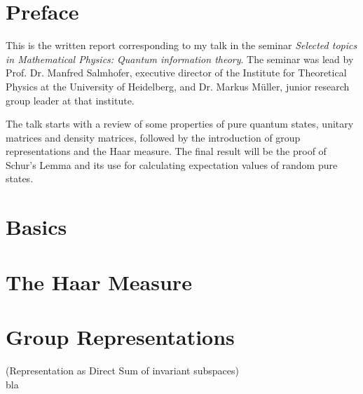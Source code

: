 \documentclass[a4paper,11pt, BCOR=4mm, DIV=12, pagesize]{scrartcl}
\begin{document}
    




\section{Preface}

This is the written report corresponding to my talk in the seminar 
\emph{Selected topics in Mathematical Physics: Quantum information theory}. The 
seminar was lead by Prof. Dr. Manfred Salmhofer, executive director of the 
Institute for Theoretical Physics at the University of Heidelberg, and Dr. 
Markus M\"uller, junior research group leader at that institute. 

The talk starts with a review of some properties of pure quantum states, 
unitary matrices and density matrices, followed by the introduction of group 
representations and the Haar measure. The final result will be the proof of 
Schur's Lemma and its use for calculating expectation values of random pure 
states.

\section{Basics}

\section{The Haar Measure}

\section{Group Representations}
\begin{thm}(Representation as Direct Sum of invariant 
subspaces)\label{thm:directsum}\\
 bla
\end{thm}
\end{document}
